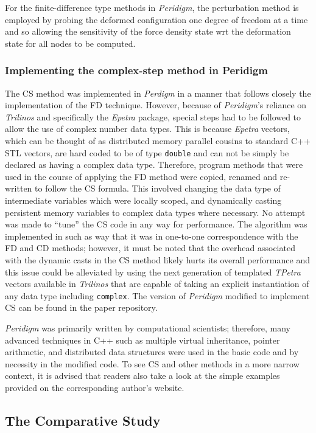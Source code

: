 \documentclass[preprint,12pt]{elsarticle}
\begin{document}
For the finite-difference type methods in \emph{Peridigm}, the perturbation method is employed
by probing the deformed configuration one degree of freedom at a time and so allowing the
sensitivity of the force density state wrt the deformation state for all nodes to be computed.

\subsubsection{Implementing the complex-step method in Peridigm} 
%
The CS method was implemented in \emph{Perdigm} in a manner that follows
closely the implementation of the FD technique.  However, because of
\emph{Peridigm}'s reliance on \emph{Trilinos} and specifically the
\emph{Epetra} package, special steps had to be followed to allow the use of
complex number data types.  This is because \emph{Epetra} vectors, which can be
thought of as distributed memory parallel cousins to standard C++ STL vectors,
are hard coded to be of type {\tt double} and can not be simply be declared as
having a complex data type. Therefore, program methods that were used in the
course of applying the FD method were copied, renamed and re-written to follow
the CS formula. This involved changing the data type of intermediate variables
which were locally scoped, and dynamically casting persistent memory variables
to complex data types where necessary. No attempt was made to ``tune'' the CS
code in any way for performance. The algorithm  was implemented in such as way
that it was in one-to-one correspondence with the FD and CD methods; however,
it must be noted that the overhead associated with the dynamic casts in the CS
method likely hurts its overall performance and this issue could be alleviated
by using the next generation of templated \emph{TPetra} vectors available in
\emph{Trilinos} that are capable of taking an explicit instantiation of any
data type including {\tt complex}. The version of \emph{Peridigm} modified to
implement CS can be found in the paper repository.  

\emph{Peridigm} was primarily written by computational scientists; therefore,
many advanced techniques in C++ such as multiple virtual inheritance, pointer
arithmetic, and distributed data structures were used in the basic code and by
necessity in the modified code.  To see CS and other methods in a more narrow
context, it is advised that readers also take a look at the simple examples
provided on the corresponding author's website.

\subsection{The Comparative Study} 
\label{tcs}
\end{document}
